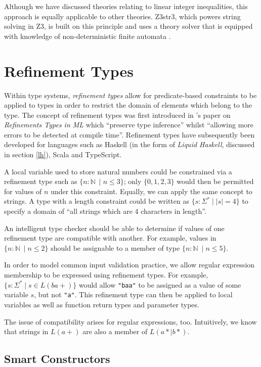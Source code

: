 \documentclass[a4paper,openany,12pt]{book}
\begin{document}
Although we have discussed theories relating to linear integer inequalities, this approach is equally applicable to
other theories.
Z3str3, which powers string solving in Z3, is built on this principle and uses a theory solver that is equipped with
knowledge of non-deterministic finite automata \citep{berzish2017z3str3}.

\section{Refinement Types}

Within type systems, \emph{refinement types} allow for predicate-based constraints to be applied to types in order to
restrict the domain of elements which belong to the type.
The concept of refinement types was first introduced in \citet{freemanreftypes}'s paper on
\emph{Refinements Types in ML} which ``preserve type inference'' whilst ``allowing more errors to be detected at
compile time''.
Refinement types have subsequently been developed for languages such as Haskell (in the form of \emph{Liquid Haskell},
discussed in section \ref{lh}), Scala and TypeScript.

A local variable used to store natural numbers could be constrained via a refinement type such as
$\{n: \mathbb{N}\ \mid n \leq 3\}$; only $\{0, 1, 2, 3\}$ would then be permitted for values of $n$ under this
constraint.
Equally, we can apply the same concept to strings.
A type with a length constraint could be written as $\{s : \Sigma^* \mid \left| s \right| = 4 \}$ to specify a domain
of ``all strings which are 4 characters in length''.

An intelligent type checker should be able to determine if values of one refinement type are compatible with another.
For example, values in $\{n: \mathbb{N}\ \mid n \leq 2\}$ should be assignable to a member of type
$\{n: \mathbb{N}\ \mid n \leq 5\}$.

In order to model common input validation practice, we allow regular expression membership to be expressed using
refinement types.
For example, $\{s: \Sigma^* \mid s \in L(ba+)\}$ would allow \texttt{"baa"} to be assigned as a value of some variable
$s$, but not \texttt{"a"}.
This refinement type can then be applied to local variables as well as function return types and parameter types.

The issue of compatibility arises for regular expressions, too.
Intuitively, we know that strings in $L(a+)$ are also a member of $L(a*|b*)$.

\subsection{Smart Constructors}
\end{document}
